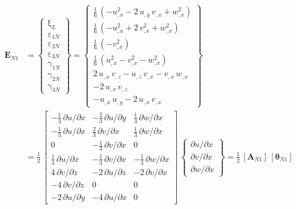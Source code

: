 \begin{equation}
\begin{aligned}
\mathbf{E}_{N1} & =  \begin{Bmatrix}
\mathrm \xi_{L} \\
\mathrm \varepsilon_{1N} \\
\mathrm \varepsilon_{2N} \\
\mathrm \varepsilon_{3N} \\
\mathrm \gamma_{1N} \\
\mathrm \gamma_{2N} \\
\mathrm \gamma_{3N} \end{Bmatrix} =
\begin{Bmatrix}
\tfrac{1}{6} \,  \left( -u_{,x}^2 - 2 \, u_{,y} \, v_{,x}  +  w_{,x}^2  \right)\\
\tfrac{1}{6} \,  \left( -u_{,x}^2 + 2 \, v_{,x}^2 +  w_{,x}^2 \right) \\
\tfrac{1}{6} \,  \left( - v_{,x}^2 \right) \\
\tfrac{1}{6} \,  \left( u_{,x}^2 - v_{,x}^2 -  w_{,x}^2  \right) \\ 
2 \, u_{,x} \, v_{,z} - u_{,z} \, v_{,x} - v_{,x} \, w_{,x} \\
 - 2 \, u_{,x} \, v_{,z} \\ 
 - u_{,x} \, u_{,y} - 2 \, u_{,x} \, v_{,x}\end{Bmatrix} \\
 & = \frac{1}{2} \, \begin{bmatrix}
-\tfrac{1}{3} \, \partial u / \partial x &  - \tfrac{2}{3} \, \partial u / \partial y & \tfrac{1}{3} \, \partial w / \partial x  \\
-\tfrac{1}{3} \, \partial u / \partial x &  \tfrac{2}{3} \, \partial v / \partial x & \tfrac{1}{3} \, \partial w / \partial x  \\
0  & -\tfrac{1}{3} \, \partial v / \partial x & 0 \\
\tfrac{1}{3} \, \partial u / \partial x &  - \tfrac{1}{3} \, \partial v / \partial x & - \tfrac{1}{3} \, \partial w / \partial x  \\
4 \, \partial v / \partial z &  - 2 \, \partial u / \partial z & - 2 \,  \partial v / \partial x  \\
- 4 \, \partial v / \partial z &  0 & 0  \\
- 2 \, \partial u / \partial y &  - 4 \, \partial u / \partial x & 0   \end{bmatrix} \, \begin{Bmatrix}
\partial u / \partial x\\
\partial v / \partial x \\
\partial w / \partial x
\end{Bmatrix}
= \tfrac{1}{2} \, [\mathbf{A}_{N1}] \, [\boldsymbol{\theta}_{N1}]
\end{aligned}
\end{equation}

